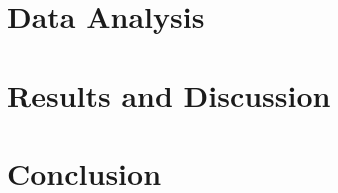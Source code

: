 \documentclass[%
 reprint,
amsmath,amssymb,
pra,
]{revtex4-1}
\begin{document}
\section{Data Analysis}

\section{Results and Discussion}

\section{Conclusion}

\end{document}
